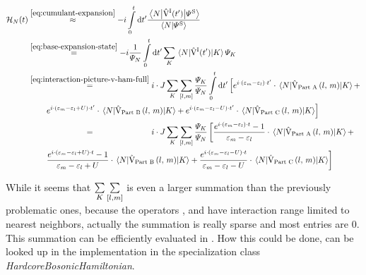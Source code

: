 \begin{equation}
    \label{eq:final-integrated-hn}
    \begin{split}
        \HNOft &\stackrel{\ref{eq:cumulant-expansion}}{\approx} -i \int\limits_0^t \mathrm{d}t' \frac{\bracketHelper{N}{\VhamiltonianOf[\interactionPicture]{t'}}{\picturePsi[\schroedingerPicture]{}}}{\braketHelper{N}{\picturePsi[\schroedingerPicture]{}}}\\
        &\stackrel{\ref{eq:base-expansion-state}}{=}
        -i \frac{1}{\psiN} \int\limits_0^t \mathrm{d}t' \lsum[K] \bracketHelper{N}{\VhamiltonianOf[\interactionPicture]{t'}}{K} \psiN[K]\\
        &\stackrel{\ref{eq:interaction-picture-v-ham-full}}{=}
        i \cdot J \lsum[K] \fullneighborsum{l}{m} \frac{\psiN[K]}{\psiN} \int\limits_0^t \mathrm{d}t' 
        \left[
            e^{i\cdot \left(\epsl[m]-\epsl\right)\cdot t'} \cdot 
            \bracketHelper{N}{
                \VhamiltonianPartA{l}{m} 
            }{K}
            + 
            \right.\\
            &\qquad
            \left.
            e^{i\cdot \left(\epsl[m]-\epsl + U\right)\cdot t'} \cdot 
            \bracketHelper{N}{
                \VhamiltonianPartB{l}{m}
            }{K}
            + 
            e^{i\cdot \left(\epsl[m]-\epsl - U\right)\cdot t'} \cdot 
            \bracketHelper{N}{
                \VhamiltonianPartC{l}{m} 
            }{K}
        \right]
        \\
        &\stackrel{\phantom{\ref{eq:interaction-picture-v-ham-full}}}{=}
        i \cdot J \lsum[K] \fullneighborsum{l}{m} \frac{\psiN[K]}{\psiN}
        \left[
            \frac{e^{i\cdot \left(\epsl[m]-\epsl\right)\cdot t}-1}{\epsl[m]-\epsl} \cdot 
            \bracketHelper{N}{
                \VhamiltonianPartA{l}{m} 
            }{K}
            + 
            \right.\\
            &\qquad
            \left.
            \frac{
                e^{i\cdot \left(\epsl[m]-\epsl + U\right)\cdot t}-1
            }{\epsl[m]-\epsl + U}
             \cdot 
            \bracketHelper{N}{
                \VhamiltonianPartB{l}{m}
            }{K}
            + 
            \frac{
                e^{i\cdot \left(\epsl[m]-\epsl - U\right)\cdot t}
            }{\epsl[m]-\epsl - U}
             \cdot 
            \bracketHelper{N}{
                \VhamiltonianPartC{l}{m} 
            }{K}
        \right]
    \end{split}
\end{equation}

While it seems that $\lsum[K] \fullneighborsum{l}{m}$ is even a larger summation than the previously problematic ones, because the operators ,  and  have interaction range limited to nearest neighbors, actually the summation is really sparse and most entries are $0$.
This summation can be efficiently evaluated in .
How this could be done, can be looked up in the implementation  in the specialization class \emph{HardcoreBosonicHamiltonian}.